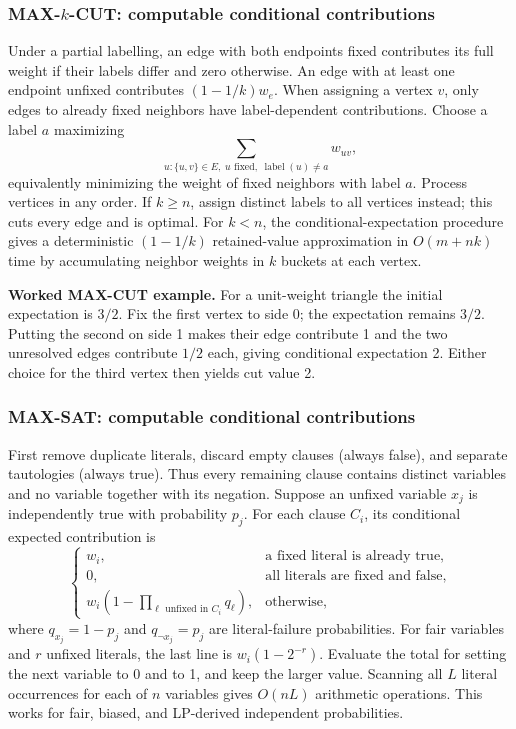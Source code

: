\documentclass[10pt]{article}
\theoremstyle{definition}
\begin{document}
\subsubsection*{MAX-$k$-CUT: computable conditional contributions}
Under a partial labelling, an edge with both endpoints fixed contributes its
full weight if their labels differ and zero otherwise. An edge with at least
one endpoint unfixed contributes $(1-1/k)w_e$. When assigning a vertex $v$,
only edges to already fixed neighbors have label-dependent contributions.
Choose a label $a$ maximizing
\[
  \sum_{u:\{u,v\}\in E,\;u\text{ fixed},\;\operatorname{label}(u)\ne a}w_{uv},
\]
equivalently minimizing the weight of fixed neighbors with label $a$.
Process vertices in any order. If $k\ge n$, assign distinct labels to all
vertices instead; this cuts every edge and is optimal. For $k<n$, the
conditional-expectation procedure gives a deterministic
$(1-1/k)$ retained-value approximation in $O(m+nk)$ time by accumulating
neighbor weights in $k$ buckets at each vertex.

\textbf{Worked MAX-CUT example.}
For a unit-weight triangle the initial expectation is $3/2$. Fix the first
vertex to side 0; the expectation remains $3/2$. Putting the second on side 1
makes their edge contribute 1 and the two unresolved edges contribute $1/2$
each, giving conditional expectation 2. Either choice for the third vertex
then yields cut value 2.

\subsubsection*{MAX-SAT: computable conditional contributions}
First remove duplicate literals, discard empty clauses (always false), and
separate tautologies (always true). Thus every remaining clause contains
distinct variables and no variable together with its negation. Suppose an
unfixed variable $x_j$ is independently true with probability $p_j$.
For each clause $C_i$, its conditional expected contribution is
\[
  \begin{cases}
    w_i, &\text{a fixed literal is already true},\\
    0, &\text{all literals are fixed and false},\\
    w_i\left(1-\displaystyle\prod_{\ell\text{ unfixed in }C_i}
       q_\ell\right), &\text{otherwise},
  \end{cases}
\]
where $q_{x_j}=1-p_j$ and $q_{\neg x_j}=p_j$ are literal-failure
probabilities. For fair variables and $r$ unfixed literals, the last line is
$w_i(1-2^{-r})$. Evaluate the total for setting the next variable to 0 and
to 1, and keep the larger value. Scanning all $L$ literal occurrences for
each of $n$ variables gives $O(nL)$ arithmetic operations. This works for
fair, biased, and LP-derived independent probabilities.
\end{document}
